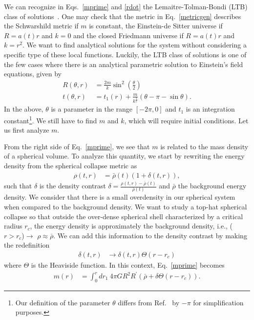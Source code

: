 \documentclass[a4paper,11pt]{article}
\begin{document}
We can recognize in Eqs.~\eqref{mprime} and \eqref{rdot} the Lemaitre-Tolman-Bondi (LTB) class of solutions~\cite{Lemaitre1933}. One may check that the metric in Eq.~\eqref{metricgen} describes the Schwarshild metric if $m$ is constant, the Einstein-de Sitter universe if $R = a(t)r$ and $k=0$ and the closed Friedmann universe if $R= a(t)r$ and $k = r^2$. We want to find analytical solutions for the system without considering a specific type of these local functions. Luckily, the LTB class of solutions is one of the few cases where there is an analytical parametric solution to Einstein's field equations, given by
\begin{align}
	\label{ltb1}
	R(\theta, r) & = \frac{2m}{k}\sin^2\left(\frac{\theta}{2}\right)                          \\
	\label{ltb2}
	t(\theta, r) & = t_1(r) + \frac{m}{k^{\frac{3}{2}}}\left(\theta - \pi - \sin\theta\right)
	.\end{align}
In the above, $\theta$ is a parameter in the range $[-2\pi, 0]$ and $t_1$ is an integration constant\footnote{Our definition of the parameter $\theta$ differs from Ref.~\cite{Martin2020} by $-\pi$ for simplification purposes.}. We still have to find $m$ and $k$, which will require initial conditions. Let us first analyze $m$.

From the right side of Eq.~\eqref{mprime}, we see that $m$ is related to the mass density of a spherical volume. To analyze this quantity, we start by rewriting the energy density from the spherical collapse metric as
\begin{align}
	\rho(t, r) & = \bar{\rho}(t)(1 + \delta(t,r))
	,\end{align}
such that $\delta$ is the density contrast $\delta = \frac{\rho(t,r) - \bar{\rho}(t)}{\bar{\rho}(t)}$ and $\bar{\rho}$ the background energy density.  We consider that there is a small overdensity in our spherical system when compared to the background density. We want to study a top-hat spherical collapse so that outside the over-dense spherical shell characterized by a critical radius $r_c$, the energy density is approximately the background density, i.e., ($r > r_c$)$\rightarrow$ $\rho \approx \bar{\rho}$. We can add this information to the density contrast by making the redefinition
\begin{align}
	\delta(t, r) & \rightarrow \delta(t, r) \Theta(r-r_c)
\end{align}
where $\Theta$ is the Heaviside function. In this context, Eq.~\eqref{mprime} becomes
\begin{align}
	m(r) & = \int_0^r dr_1~ 4\pi GR^2R^\prime \left(\bar{\rho} + \delta \Theta(r-r_c)\right)
	.\end{align}
\end{document}
